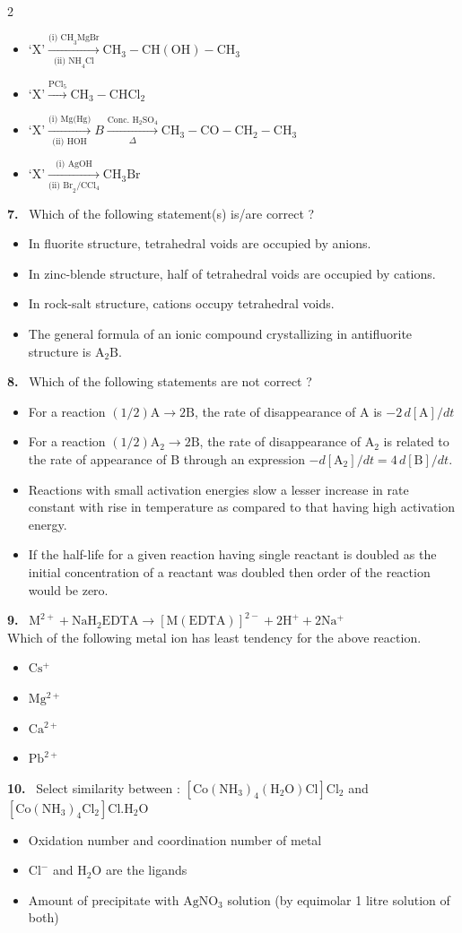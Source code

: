 \documentclass[10pt]{extarticle}
\newcommand{\qn}[1]{\par\smallskip\noindent\textbf{#1.}~}
\newenvironment{qoptions}{\begin{itemize}[leftmargin=1.8em,itemsep=1pt,topsep=2pt,label={}]}{\end{itemize}}
\newcommand{\opt}[2]{\item[(#1)] #2}
\begin{document}
\begin{multicols}{2}
\begin{qoptions}
\opt{A}{$\text{`X'}\xrightarrow[\text{(ii) NH}_4\text{Cl}]{\text{(i) CH}_3\text{MgBr}}\mathrm{CH_3{-}CH(OH){-}CH_3}$}
\opt{B}{$\text{`X'}\xrightarrow{\mathrm{PCl_5}}\mathrm{CH_3{-}CHCl_2}$}
\opt{C}{$\text{`X'}\xrightarrow[\text{(ii) HOH}]{\text{(i) Mg(Hg)}}B\xrightarrow[\Delta]{\text{Conc. H}_2\text{SO}_4}\mathrm{CH_3{-}CO{-}CH_2{-}CH_3}$}
\opt{D}{$\text{`X'}\xrightarrow[\text{(ii) Br}_2/\text{CCl}_4]{\text{(i) AgOH}}\mathrm{CH_3Br}$}
\end{qoptions}
\qn{7} Which of the following statement(s) is/are correct ?
\begin{qoptions}
\opt{A}{In fluorite structure, tetrahedral voids are occupied by anions.}
\opt{B}{In zinc-blende structure, half of tetrahedral voids are occupied by cations.}
\opt{C}{In rock-salt structure, cations occupy tetrahedral voids.}
\opt{D}{The general formula of an ionic compound crystallizing in antifluorite structure is $\mathrm{A_2B}$.}
\end{qoptions}
\qn{8} Which of the following statements are not correct ?
\begin{qoptions}
\opt{A}{For a reaction $(1/2)\mathrm{A}\to2\mathrm{B}$, the rate of disappearance of A is $-2\,d[\mathrm{A}]/dt$}
\opt{B}{For a reaction $(1/2)\mathrm{A_2}\to2\mathrm{B}$, the rate of disappearance of $\mathrm{A_2}$ is related to the rate of appearance of B through an expression $-d[\mathrm{A_2}]/dt=4\,d[\mathrm{B}]/dt$.}
\opt{C}{Reactions with small activation energies slow a lesser increase in rate constant with rise in temperature as compared to that having high activation energy.}
\opt{D}{If the half-life for a given reaction having single reactant is doubled as the initial concentration of a reactant was doubled then order of the reaction would be zero.}
\end{qoptions}
\qn{9} $\mathrm{M^{2+}+NaH_2EDTA\to[M(EDTA)]^{2-}+2H^++2Na^+}$\\
Which of the following metal ion has least tendency for the above reaction.
\begin{qoptions}
\opt{A}{$\mathrm{Cs^+}$}
\opt{B}{$\mathrm{Mg^{2+}}$}
\opt{C}{$\mathrm{Ca^{2+}}$}
\opt{D}{$\mathrm{Pb^{2+}}$}
\end{qoptions}
\qn{10} Select similarity between : $\mathrm{[Co(NH_3)_4(H_2O)Cl]Cl_2}$ and $\mathrm{[Co(NH_3)_4Cl_2]Cl.H_2O}$
\begin{qoptions}
\opt{A}{Oxidation number and coordination number of metal}
\opt{B}{$\mathrm{Cl^-}$ and $\mathrm{H_2O}$ are the ligands}
\opt{C}{Amount of precipitate with $\mathrm{AgNO_3}$ solution (by equimolar 1 litre solution of both)}

\end{qoptions}
\end{multicols}
\end{document}
